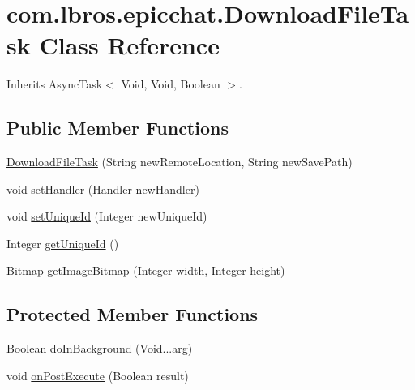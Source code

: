 \hypertarget{classcom_1_1lbros_1_1epicchat_1_1_download_file_task}{\section{com.\-lbros.\-epicchat.\-Download\-File\-Task Class Reference}
\label{classcom_1_1lbros_1_1epicchat_1_1_download_file_task}
}


Inherits Async\-Task$<$ Void, Void, Boolean $>$.

\subsection*{Public Member Functions}
\begin{DoxyCompactItemize}
\item 
\hyperlink{classcom_1_1lbros_1_1epicchat_1_1_download_file_task_a785df96ba421a5e6cbfa71c3a6f8e9e4}{Download\-File\-Task} (String new\-Remote\-Location, String new\-Save\-Path)
\item 
void \hyperlink{classcom_1_1lbros_1_1epicchat_1_1_download_file_task_a91880a26b9c6f73bb204064cda238d05}{set\-Handler} (Handler new\-Handler)
\item 
void \hyperlink{classcom_1_1lbros_1_1epicchat_1_1_download_file_task_a34223f37c1087dd0b1ffd6a247e04775}{set\-Unique\-Id} (Integer new\-Unique\-Id)
\item 
Integer \hyperlink{classcom_1_1lbros_1_1epicchat_1_1_download_file_task_a3c3c36dcf4898b58f3f922ae1f60ef8d}{get\-Unique\-Id} ()
\item 
Bitmap \hyperlink{classcom_1_1lbros_1_1epicchat_1_1_download_file_task_a619c8e86f4de1e0d51a11c70d3dc546a}{get\-Image\-Bitmap} (Integer width, Integer height)
\end{DoxyCompactItemize}
\subsection*{Protected Member Functions}
\begin{DoxyCompactItemize}
\item 
Boolean \hyperlink{classcom_1_1lbros_1_1epicchat_1_1_download_file_task_ac1357678032c32ea8fb0ee0f7b3b37ff}{do\-In\-Background} (Void...\-arg)
\item 
void \hyperlink{classcom_1_1lbros_1_1epicchat_1_1_download_file_task_a7cf9b0c9e0b8e6a95c61e2a2f34996f6}{on\-Post\-Execute} (Boolean result)
\end{DoxyCompactItemize}


